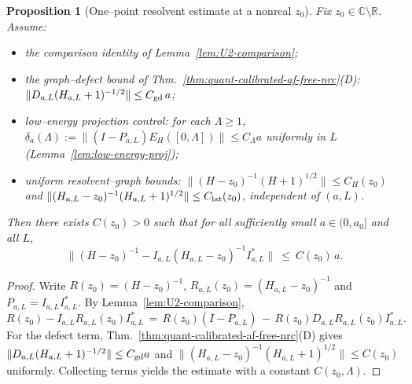 \documentclass[11pt]{amsart}
\theoremstyle{plain}
\newtheorem{proposition}[theorem]{Proposition}
\theoremstyle{definition}
\theoremstyle{remark}
\begin{document}
\begin{proposition}[One–point resolvent estimate at a nonreal $z_0$]\label{prop:one-point-resolvent}
Fix $z_0\in\mathbb C\setminus\mathbb R$. Assume:
\begin{itemize}
  \item the comparison identity of Lemma~\ref{lem:U2-comparison};
  \item the graph–defect bound of Thm.~\ref{thm:quant-calibrated-af-free-nrc}(D): $\|D_{a,L}(H_{a,L}+1)^{-1/2}\|\le C_{\rm gd}\,a$;
  \item low–energy projection control: for each $\Lambda\ge 1$, $\delta_a(\Lambda):=\|(I-P_{a,L})E_H([0,\Lambda])\|\le C_\Lambda a$ uniformly in $L$ (Lemma~\ref{lem:low-energy-proj});
  \item uniform resolvent–graph bounds: $\|(H-z_0)^{-1}(H+1)^{1/2}\|\le C_H(z_0)$ and $\|(H_{a,L}-z_0)^{-1}(H_{a,L}+1)^{1/2}\|\le C_{\rm lat}(z_0)$, independent of $(a,L)$.
\end{itemize}
Then there exists $C(z_0)>0$ such that for all sufficiently small $a\in(0,a_0]$ and all $L$,
\[
  \big\|(H-z_0)^{-1} - I_{a,L}(H_{a,L}-z_0)^{-1} I_{a,L}^*\big\|\ \le\ C(z_0)\, a.
\]
\end{proposition}
\begin{proof}
Write $R(z_0)=(H-z_0)^{-1}$, $R_{a,L}(z_0)=(H_{a,L}-z_0)^{-1}$ and $P_{a,L}=I_{a,L}I_{a,L}^*$. By Lemma~\ref{lem:U2-comparison},
\[
  R(z_0) - I_{a,L} R_{a,L}(z_0) I_{a,L}^* \,=\, R(z_0)(I-P_{a,L}) \, -\, R(z_0) D_{a,L} R_{a,L}(z_0) I_{a,L}^*.
\]
For the defect term, Thm.~\ref{thm:quant-calibrated-af-free-nrc}(D) gives $\|D_{a,L}(H_{a,L}+1)^{-1/2}\|\le C_{\rm gd} a$ and $\|(H_{a,L}-z_0)^{-1}(H_{a,L}+1)^{1/2}\|\le C(z_0)$ uniformly. Collecting terms yields the estimate with a constant $C(z_0,\Lambda)$.
\end{proof}
\end{document}
